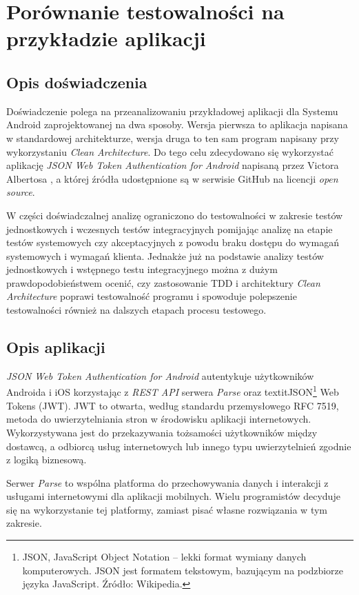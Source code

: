 \chapter{Porównanie testowalności na przykładzie aplikacji}
\label{analiza_testow}

\section{Opis doświadczenia}
Doświadczenie polega na przeanalizowaniu przykładowej aplikacji dla Systemu Android zaprojektowanej na dwa sposoby. Wersja pierwsza to aplikacja napisana w standardowej architekturze, wersja druga to ten sam program napisany przy wykorzystaniu \textit{Clean Architecture}. Do tego celu zdecydowano się wykorzystać
aplikację \textit{JSON Web Token Authentication for Android} napisaną przez Victora Albertosa \cite{website:victor:aplication} , a której źródła udostępnione są w serwisie GitHub na licencji \textit{open source}.

W części doświadczalnej analizę ograniczono do testowalności w zakresie testów jednostkowych i wczesnych testów integracyjnych pomijając analizę na etapie testów systemowych czy akceptacyjnych z powodu braku dostępu do wymagań systemowych i wymagań klienta. Jednakże już na podstawie analizy testów jednostkowych i wstępnego testu integracyjnego można z dużym prawdopodobieństwem ocenić, czy zastosowanie TDD i architektury \textit{Clean Architecture} poprawi testowalność programu i spowoduje polepszenie testowalności również na dalszych etapach procesu testowego.

\section{Opis aplikacji}
\textit{JSON Web Token Authentication for Android} autentykuje użytkowników Androida i iOS korzystając z \textit{REST API} serwera \textit{Parse} oraz textit{JSON\footnote{JSON, JavaScript Object Notation – lekki format wymiany danych komputerowych. JSON jest formatem tekstowym, bazującym na podzbiorze języka JavaScript. Źródło: Wikipedia.} Web Tokens (JWT)}. JWT to otwarta, według standardu przemysłowego RFC 7519\cite{website:jwt:rfc7519}, metoda do uwierzytelniania stron w środowisku aplikacji internetowych. Wykorzystywana jest do przekazywania tożsamości użytkowników między dostawcą, a odbiorcą usług internetowych lub innego typu uwierzytelnień zgodnie z logiką biznesową. 

Serwer \textit{Parse} to wspólna platforma do przechowywania danych i interakcji z usługami internetowymi dla aplikacji mobilnych. Wielu programistów decyduje się na wykorzystanie tej platformy, zamiast pisać własne rozwiązania w tym zakresie.

